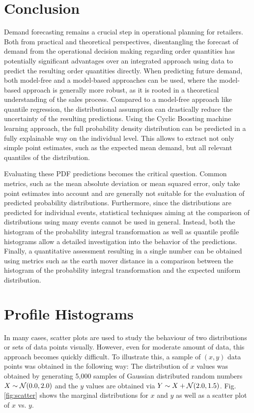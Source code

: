 \documentclass[BCOR=1mm, DIV=calc,10pt,
twoside=true,
twocolumn,
headings=normal]{scrartcl}
\newcommand{\fig}{Fig.}
\begin{document}
\section{Conclusion}
Demand forecasting remains a crucial step in operational planning for retailers. Both from practical and theoretical perspectives, disentangling the forecast of demand from the operational decision making regarding order quantities has potentially significant advantages over an integrated approach using data to predict the resulting order quantities directly. When predicting future demand, both model-free and a model-based approaches can be used, where the model-based approach is generally more robust, as it is rooted in a theoretical understanding of the sales process. Compared to a model-free approach like quantile regression, the distributional assumption can drastically reduce the uncertainty of the resulting predictions. Using the Cyclic Boosting machine learning approach, the full probability density distribution can be predicted in a fully explainable way on the individual level. This allows to extract not only simple point estimates, such as the expected mean demand, but all relevant quantiles of the distribution.

Evaluating these PDF predictions becomes the critical question. Common metrics, such as the mean absolute deviation or mean squared error, only take point estimates into account and are generally not suitable for the evaluation of predicted probability distributions. Furthermore, since the distributions are predicted for individual events, statistical techniques aiming at the comparison of distributions using many events cannot be used in general. Instead, both the histogram of the probability integral transformation as well as quantile profile histograms allow a detailed investigation into the behavior of the predictions. Finally, a quantitative assessment resulting in a single number can be obtained using metrics such as the earth mover distance in a comparison between the histogram of the probability integral transformation and the expected uniform distribution.





\appendix

\section{Profile Histograms}
\label{sec:profile}

In many cases, scatter plots are used to study the behaviour of two distributions or sets of data points visually. However, even for moderate amount of data, this approach becomes quickly difficult. To illustrate this, a sample of $(x,y)$ data points was obtained in the following way: The distribution of $x$ values was obtained by generating 5,000 samples of Gaussian distributed random numbers $X \sim {\cal N}(0.0,2.0)$ and the $y$ values are obtained via $Y \sim X +  {\cal N}(2.0,1.5)$. \fig \ref{fig:scatter} shows the marginal distributions for $x$ and $y$ as well as a scatter plot of $x$ vs. $y$.
\end{document}
